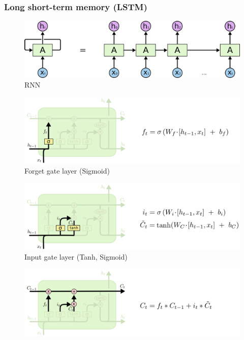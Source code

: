 \begin{frame}[allowframebreaks]
    \frametitle{Long short-term memory (LSTM)}
    \begin{figure}[htp]
        \centering
        \includegraphics[width=\textwidth]{images/v1survey/RNN-unrolled.png}
        \caption{RNN}
    \end{figure}
    \begin{figure}[htp]
        \centering
        \includegraphics[width=\textwidth]{images/v1survey/LSTM-1.png}
        \caption{Forget gate layer (Sigmoid)}
    \end{figure}
    \begin{figure}[htp]
        \centering
        \includegraphics[width=\textwidth]{images/v1survey/LSTM-2.png}
        \caption{Input gate layer (Tanh, Sigmoid)}
    \end{figure}
    \begin{figure}[htp]
        \centering
        \includegraphics[width=\textwidth]{images/v1survey/LSTM-3.png}

\end{figure}
\end{frame}
